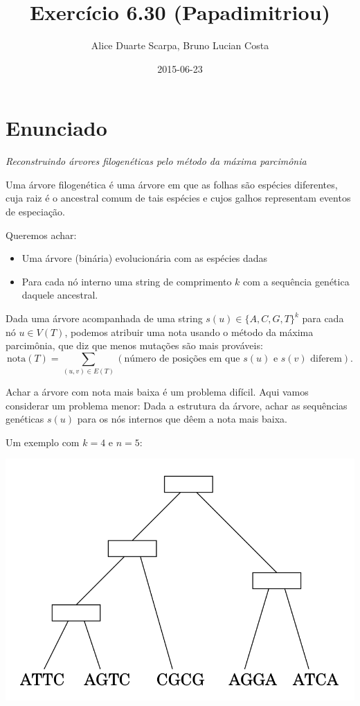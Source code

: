 \documentclass[11pt]{article}
\author{Alice Duarte Scarpa, Bruno Lucian Costa}
\date{2015-06-23}
\title{Exercício 6.30 (Papadimitriou)}
\begin{document}
\maketitle

\section{Enunciado}
\label{sec-1}

\textit{Reconstruindo árvores filogenéticas pelo método da máxima parcimônia}

Uma árvore filogenética é uma árvore em que as folhas são espécies
diferentes, cuja raiz é o ancestral comum de tais espécies e cujos
galhos representam eventos de especiação.

Queremos achar:

\begin{itemize}
\item Uma árvore (binária) evolucionária com as espécies dadas
\item Para cada nó interno uma string de comprimento $k$ com a
sequência genética daquele ancestral.
\end{itemize}


Dada uma árvore acompanhada de uma string $s(u) \in \{A, C, G, T\}^k$ para
cada nó $u \in V(T)$, podemos atribuir uma nota usando o método da
máxima parcimônia, que diz que menos mutações são mais prováveis:
\[ \mathrm{nota}(T) = \sum_{(u,v) \in E(T)} (\text{número de posições em que }s(u)\text{ e }s(v)\text{ diferem}). \]

Achar a árvore com nota mais baixa é um problema difícil. Aqui vamos
considerar um problema menor: Dada a estrutura da árvore, achar as
sequências genéticas $s(u)$ para os nós internos que dêem a nota mais
baixa.

Um exemplo com $k = 4$ e $n = 5$:

\href{http://github.com/adusca/FGV-EDA/6_30/tree.png}{\includegraphics[width=.9\linewidth]{tree.png}}
\end{document}
